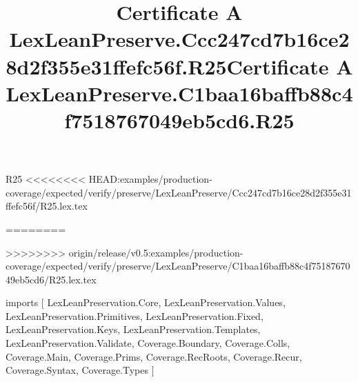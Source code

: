 \begin{lexlean}{R25}
<<<<<<<< HEAD:examples/production-coverage/expected/verify/preserve/LexLeanPreserve/Ccc247cd7b16ce28d2f355e31ffefc56f/R25.lex.tex
\title{Certificate A LexLeanPreserve.Ccc247cd7b16ce28d2f355e31ffefc56f.R25}
========
\title{Certificate A LexLeanPreserve.C1baa16baffb88c4f7518767049eb5cd6.R25}
>>>>>>>> origin/release/v0.5:examples/production-coverage/expected/verify/preserve/LexLeanPreserve/C1baa16baffb88c4f7518767049eb5cd6/R25.lex.tex
\begin{coremodule}
imports [
  LexLeanPreservation.Core,
  LexLeanPreservation.Values,
  LexLeanPreservation.Primitives,
  LexLeanPreservation.Fixed,
  LexLeanPreservation.Keys,
  LexLeanPreservation.Templates,
  LexLeanPreservation.Validate,
  Coverage.Boundary,
  Coverage.Colls,
  Coverage.Main,
  Coverage.Prims,
  Coverage.RecRoots,
  Coverage.Recur,
  Coverage.Syntax,
  Coverage.Types
]


\end{coremodule}
\end{lexlean}
